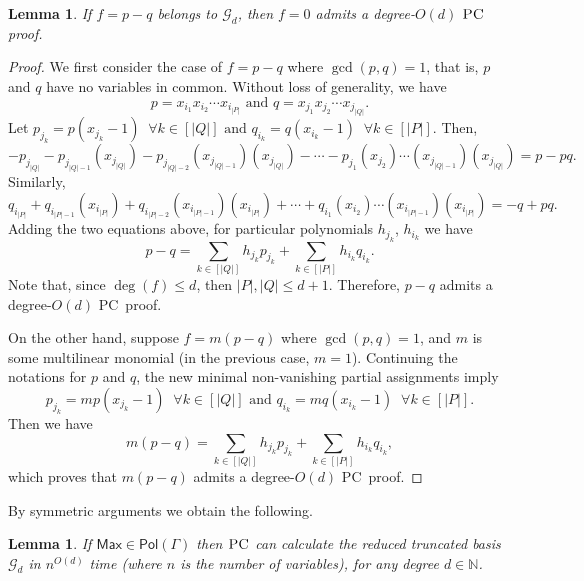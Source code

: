 \documentclass[11pt]{article}
\newcommand{\Pol}{\textsf{Pol}}
\newcommand{\PC}{\textsc{PC}}
\newcommand{\Max}{\textsf{Max}}
\newcommand{\1}{\textbf{1}}
\newcommand{\GB}{\text{Gr\"{o}bner} }
\newtheorem{lemma}[theorem]{Lemma}
\begin{document}
\begin{lemma}\label{th:f_sos}
If $f=p-q$ belongs to $\mathcal{G}_d$, then $f=0$ admits a degree-$O(d)$ $\PC$ proof.
\end{lemma}
\begin{proof}
    We first consider the case of $f=p-q$ where $\gcd(p,q)=1$, that is, $p$ and $q$ have no variables in common. Without loss of generality, we have
\begin{equation*}
    p = x_{i_1}x_{i_2}\cdots x_{i_{|P|}} \textrm{ and } q = x_{j_1}x_{j_2}\cdots x_{j_{|Q|}}.
\end{equation*}
Let 
$p_{j_k} = p(x_{j_k}-1) \;\;\forall k\in [|Q|] \textrm{ and } q_{i_k} = q(x_{i_k}-1) \;\;\forall k\in [|P|].$
Then,
\begin{equation*}
    - p_{j_{|Q|}} - p_{j_{|Q|-1}}(x_{j_{|Q|}}) - p_{j_{|Q|-2}}(x_{j_{|Q|-1}})(x_{j_{|Q|}}) - \cdots - p_{j_{1}}(x_{j_2})\cdots(x_{j_{|Q|-1}})(x_{j_{|Q|}}) = p - pq.
\end{equation*}
Similarly, 
\begin{equation*}
    q_{i_{|P|}} + q_{i_{|P|-1}}(x_{i_{|P|}}) + q_{i_{|P|-2}}(x_{i_{|P|-1}})(x_{i_{|P|}}) + \cdots + q_{i_{1}}(x_{i_2})\cdots(x_{i_{|P|-1}})(x_{i_{|P|}}) = -q + pq.
\end{equation*}
Adding the two equations above, for particular polynomials $h_{j_k}$, $h_{i_k}$  we have
\begin{equation*}
    p - q = \sum_{k\in [|Q|]} h_{j_{k}}p_{j_{k}} + \sum_{k \in [|P|]} h_{i_{k}}q_{i_{k}}.
\end{equation*}
Note that, since $\deg(f) \leq d$, then $|P|,|Q| \leq d+1$. Therefore, $p-q$ admits a degree-$O(d)$ \PC\ proof.

On the other hand, suppose $f=m(p-q)$ where $\gcd(p,q)=1$, and $m$ is some multilinear monomial (in the previous case, $m=1$). Continuing the notations for $p$ and $q$, the new minimal non-vanishing partial assignments imply
\begin{equation*}
    p_{j_k} = mp(x_{j_k}-1) \;\;\forall k\in [|Q|] \textrm{ and } q_{i_k} = mq(x_{i_k}-1) \;\;\forall k\in [|P|].
\end{equation*}
Then we have
\begin{equation*}
    m(p - q) = \sum_{k\in [|Q|]} h_{j_{k}}p_{j_{k}} + \sum_{k \in [|P|]} h_{i_{k}}q_{i_{k}},
\end{equation*}
which proves that $m(p-q)$ admits a degree-$O(d)$ \PC\ proof.
\end{proof}
By symmetric arguments we obtain the following.
\begin{lemma}\label{th:Max}
If $\Max\in\Pol(\Gamma)$ then $\PC$ can calculate the reduced truncated basis \GB $\mathcal{G}_d$ in $n^{O(d)}$ time (where $n$ is the number of variables), for any degree $d\in \mathbb{N}$.
\end{lemma}
\end{document}
